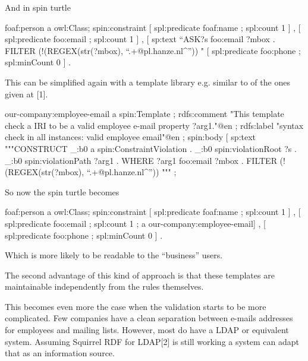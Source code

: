 \documentclass{llncs}
\begin{document}
And in spin turtle

\begin{ex}
foaf:person a owl:Class;
spin:constraint [ spl:predicate foaf:name ;
                  spl:count 1 ] ,
                [ spl:predicate foo:email ;
                  spl:count 1 ] ,
                [ sp:text “ASK{?s foo:email ?mbox . FILTER (!(REGEX(str(?mbox), “.+@pl.hanze.nl^”)) }"
                [ spl:predicate foo:phone ;
                  spl:minCount 0 ] .
\end{ex}

This can be simplified again with a template library e.g. similar to of the ones given at [1].

\begin{ex}
our-company:employee-email 
      a       spin:Template ;
      rdfs:comment "This template check a IRI to be a valid employee e-mail property ?arg1."@en ;
      rdfs:label "syntax check in all instances:  valid employee email"@en ;
      spin:body
              [ sp:text """CONSTRUCT {
                 _:b0 a spin:ConstraintViolation .
                 _:b0 spin:violationRoot ?s .
                 _:b0 spin:violationPath ?arg1 .
                }
                WHERE {
                 ?arg1 foo:email ?mbox .
                 FILTER (!(REGEX(str(?mbox), “.+@pl.hanze.nl^”))
                }""" ;
\end{ex}

So now the spin turtle becomes

\begin{ex}
foaf:person a owl:Class;
spin:constraint [ spl:predicate foaf:name ;
                  spl:count 1 ] ,
                [ spl:predicate foo:email ;
                  spl:count 1 ;
		  a our-company:employee-email] ,
                [ spl:predicate foo:phone ;
                  spl:minCount 0 ] .
\end{ex}

Which is more likely to be readable to the “business” users.

The second advantage of this kind of approach is that these templates are maintainable independently from the rules themselves.

This becomes even more the case when the validation starts to be more complicated.
Few companies have a clean separation between e-mails addresses for employees and mailing lists.
However, most do have a LDAP or equivalent system. Assuming Squirrel RDF for LDAP[2] is still working
a system can adapt that as an information source.
\end{document}
